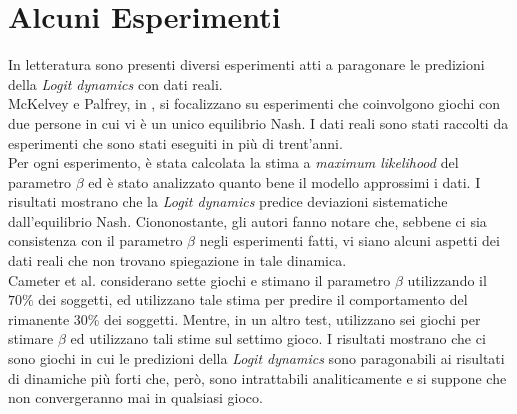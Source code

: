 \section{Alcuni Esperimenti}
In letteratura sono presenti diversi esperimenti atti a paragonare le predizioni della \textit{Logit dynamics} con dati reali.\\
McKelvey e Palfrey, in \cite{mckelvey1993quantal}, si focalizzano su esperimenti che coinvolgono giochi con due persone in cui vi è un unico equilibrio Nash. I dati reali sono stati raccolti da esperimenti che sono stati eseguiti in più di trent'anni.\\
Per ogni esperimento, è stata calcolata la stima a \textit{maximum likelihood} del parametro $\beta$ ed è stato analizzato quanto bene il modello approssimi i dati.
I risultati mostrano che la \textit{Logit dynamics} predice deviazioni sistematiche dall'equilibrio Nash. Ciononostante, gli autori fanno notare che, sebbene ci sia consistenza con il parametro $\beta$ negli esperimenti fatti, vi siano alcuni aspetti dei dati reali che non trovano spiegazione in tale dinamica.\\
Cameter et al. \cite{ho2007self} considerano sette giochi e stimano il parametro $\beta$ utilizzando il $70\%$ dei soggetti, ed utilizzano tale stima per predire il comportamento del rimanente $30\%$ dei soggetti. Mentre, in un altro test, utilizzano sei giochi per stimare $\beta$ ed utilizzano tali stime sul settimo gioco. I risultati mostrano che ci sono giochi in cui le predizioni della \textit{Logit dynamics} sono paragonabili ai risultati di dinamiche più forti che, però, sono intrattabili analiticamente e si suppone che non convergeranno mai in qualsiasi gioco.